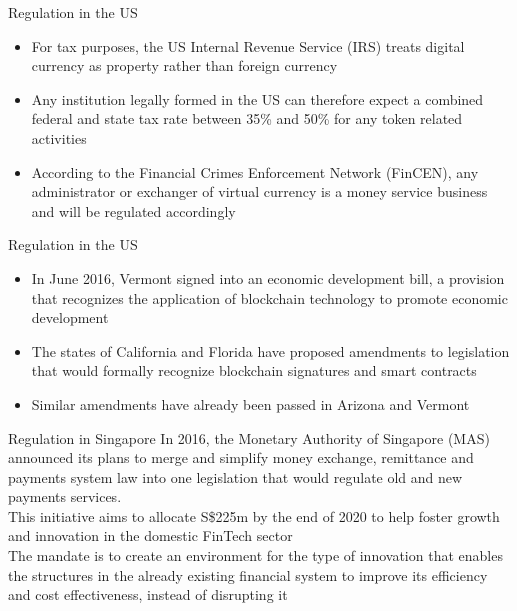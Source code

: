 \documentclass[11pt]{beamer}
\begin{document}

\begin{frame}{Regulation in the US}
	\begin{itemize}
		\item For tax purposes, the US Internal Revenue Service (IRS) treats digital currency as property rather than foreign currency
		\item Any institution legally formed in the US can therefore expect a combined federal and state tax rate between 35\% and 50\% for any token related activities
		\item According to the Financial Crimes Enforcement Network (FinCEN), any administrator or exchanger of virtual currency is a money service business and will  be regulated accordingly
	\end{itemize}
\end{frame}


\begin{frame}{Regulation in the US}
	\begin{itemize}
		\item In June 2016, Vermont signed into an economic development bill, a provision that recognizes the application of blockchain technology to  promote economic development
		\item The states of California and Florida have proposed amendments to legislation that would formally recognize blockchain signatures and smart contracts
		\item Similar amendments have already been passed in Arizona and Vermont
	\end{itemize}
\end{frame}


\begin{frame}{Regulation in Singapore}
	In 2016, the Monetary Authority of Singapore (MAS) announced its plans to merge and simplify money exchange, remittance and payments system law into one legislation that would regulate old and new payments services. \\ \vspace{3mm}
	This initiative aims to allocate S\$225m by the end of 2020 to help foster growth and innovation in the domestic FinTech sector\\ \vspace{3mm}
	The mandate is to create an environment for the type of innovation that enables the structures in the already existing financial system to improve its efficiency and cost effectiveness, instead of disrupting it
\end{frame}
\end{document}
